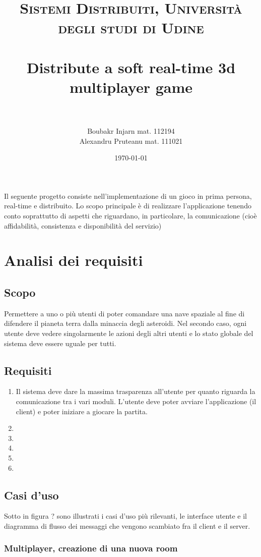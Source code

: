 \documentclass[paper=a4, fontsize=11pt]{scrartcl} %
\title{	
\normalfont \normalsize 
\textsc{Sistemi Distribuiti, Università degli studi di Udine} \\ [25pt] %
\horrule{0.5pt} \\[0.4cm] %
\huge Distribute a soft real-time 3d multiplayer game\\%
\horrule{2pt} \\[0.5cm] %
}
\author{Boubakr Injarn mat. 112194\\Alexandru Pruteanu mat. 111021} %
\date{\normalsize\today} %
\numberwithin{equation}{section} %
\numberwithin{figure}{section} %
\numberwithin{table}{section} %
\begin{document}
\maketitle %
\newpage
\tableofcontents
\listoffigures
\newpage
\textbf{\abstractname}

Il seguente progetto consiste nell'implementazione di un gioco in prima persona,
real-time e distribuito. Lo scopo principale è di realizzare l'applicazione tenendo
conto soprattutto di aspetti che riguardano, in particolare, la comunicazione
(cioè affidabilità, consistenza e disponibilità del servizio)

\section{Analisi dei requisiti}
\subsection{Scopo}
Permettere a uno o più utenti di poter comandare una nave spaziale al fine di difendere il pianeta terra dalla minaccia degli asteroidi. Nel secondo caso, ogni utente deve vedere singolarmente le azioni degli altri utenti e lo stato globale del sistema deve essere uguale per tutti.
\subsection{Requisiti}
\begin{enumerate}
\item Il sistema deve dare la massima trasparenza all'utente per quanto riguarda la comunicazione tra i vari moduli. L'utente deve poter avviare l'applicazione (il client) e poter iniziare a giocare la partita.
\item 
\item
\item
\item
\item
\end{enumerate}


\subsection{Casi d'uso}
Sotto in figura ? sono illustrati i casi d'uso più rilevanti, le interface utente e il
diagramma di flusso dei messaggi che vengono scambiato fra il client e il server.


\subsubsection{Multiplayer, creazione di una nuova room}
\end{document}
